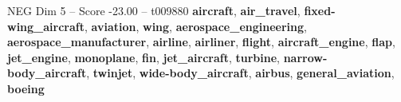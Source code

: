 \begin{textsample}{NEG Dim 5 – Score -23.00 – t009880}  \label{ex:f5_neg_006}
\textbf{aircraft}, \textbf{air\_travel}, \textbf{fixed-wing\_aircraft}, \textbf{aviation}, \textbf{wing}, \textbf{aerospace\_engineering}, \textbf{aerospace\_manufacturer}, \textbf{airline}, \textbf{airliner}, \textbf{flight}, \textbf{aircraft\_engine}, \textbf{flap}, \textbf{jet\_engine}, \textbf{monoplane}, \textbf{fin}, \textbf{jet\_aircraft}, \textbf{turbine}, \textbf{narrow-body\_aircraft}, \textbf{twinjet}, \textbf{wide-body\_aircraft}, \textbf{airbus}, \textbf{general\_aviation}, \textbf{boeing}

\end{textsample}
